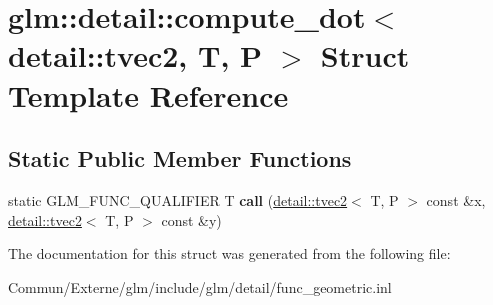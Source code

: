 \hypertarget{structglm_1_1detail_1_1compute__dot_3_01detail_1_1tvec2_00_01_t_00_01_p_01_4}{}\section{glm\+:\+:detail\+:\+:compute\+\_\+dot$<$ detail\+:\+:tvec2, T, P $>$ Struct Template Reference}
\label{structglm_1_1detail_1_1compute__dot_3_01detail_1_1tvec2_00_01_t_00_01_p_01_4}
\subsection*{Static Public Member Functions}
\begin{DoxyCompactItemize}
\item 
static G\+L\+M\+\_\+\+F\+U\+N\+C\+\_\+\+Q\+U\+A\+L\+I\+F\+I\+ER T {\bfseries call} (\hyperlink{structglm_1_1detail_1_1tvec2}{detail\+::tvec2}$<$ T, P $>$ const \&x, \hyperlink{structglm_1_1detail_1_1tvec2}{detail\+::tvec2}$<$ T, P $>$ const \&y)\hypertarget{structglm_1_1detail_1_1compute__dot_3_01detail_1_1tvec2_00_01_t_00_01_p_01_4_a5ab1761eaa0efc9ecb4f62171d2a6dd2}{}\label{structglm_1_1detail_1_1compute__dot_3_01detail_1_1tvec2_00_01_t_00_01_p_01_4_a5ab1761eaa0efc9ecb4f62171d2a6dd2}

\end{DoxyCompactItemize}


The documentation for this struct was generated from the following file\+:\begin{DoxyCompactItemize}
\item 
Commun/\+Externe/glm/include/glm/detail/func\+\_\+geometric.\+inl\end{DoxyCompactItemize}
